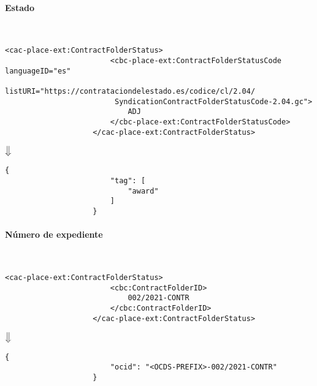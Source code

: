             \paragraph{Estado} \mbox{}\\
                \begin{lstlisting}[language=lXML]
                    <cac-place-ext:ContractFolderStatus>
                        <cbc-place-ext:ContractFolderStatusCode languageID="es"
                         listURI="https://contrataciondelestado.es/codice/cl/2.04/
                         SyndicationContractFolderStatusCode-2.04.gc">
                            ADJ
                        </cbc-place-ext:ContractFolderStatusCode>
                    </cac-place-ext:ContractFolderStatus>
                \end{lstlisting}
                
                \begin{center}
                    $\big\Downarrow$
                \end{center}
                
                \begin{lstlisting}[language=lJSON]
                    {
                        "tag": [
                            "award"
                        ]
                    }
                \end{lstlisting}
                
            \paragraph{Número de expediente} \mbox{}\\
                \begin{lstlisting}[language=lXML]
                    <cac-place-ext:ContractFolderStatus>
                        <cbc:ContractFolderID>
                            002/2021-CONTR
                        </cbc:ContractFolderID>
                    </cac-place-ext:ContractFolderStatus>
                \end{lstlisting}
                
                \begin{center}
                    $\big\Downarrow$
                \end{center}
                
                \begin{lstlisting}[language=lJSON]
                    {
                        "ocid": "<OCDS-PREFIX>-002/2021-CONTR"
                    }
                \end{lstlisting}
                
